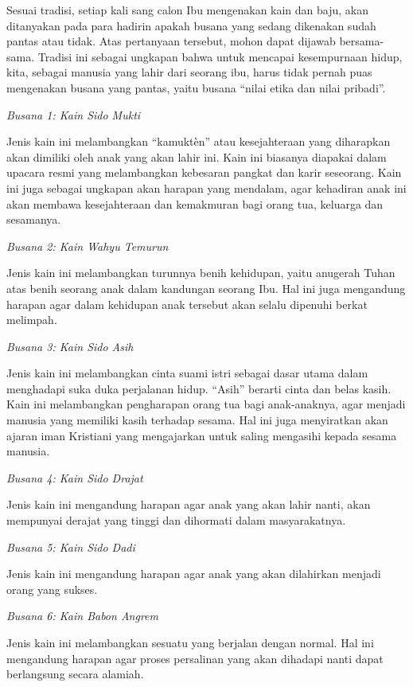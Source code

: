 \documentclass[a5paper,headsepline,titlepage,10pt,nnormalheadings,DIVcalc,twoside]{scrbook}
\begin{document}
{Sesuai tradisi, setiap kali sang calon Ibu mengenakan kain dan baju, akan ditanyakan pada para hadirin apakah busana yang sedang dikenakan sudah pantas atau tidak. Atas pertanyaan tersebut, mohon dapat dijawab bersama-sama. Tradisi ini sebagai ungkapan bahwa untuk mencapai kesempurnaan hidup, kita, sebagai manusia yang lahir dari seorang ibu, harus tidak pernah puas mengenakan busana yang pantas, yaitu busana “nilai etika dan nilai pribadi”.
 
\textit{Busana 1: Kain Sido Mukti}
 
Jenis kain ini melambangkan “kamuktèn” atau kesejahteraan yang diharapkan akan dimiliki oleh anak yang akan lahir ini. Kain ini biasanya diapakai dalam upacara resmi yang melambangkan kebesaran pangkat dan karir seseorang. Kain ini juga sebagai ungkapan akan harapan yang mendalam, agar kehadiran anak ini akan membawa kesejahteraan dan kemakmuran bagi orang tua, keluarga dan sesamanya.
 
\textit{Busana 2: Kain Wahyu Temurun}
 
Jenis kain ini melambangkan turunnya benih kehidupan, yaitu anugerah Tuhan atas benih seorang anak dalam kandungan seorang Ibu. Hal ini juga mengandung harapan agar dalam kehidupan anak tersebut akan selalu dipenuhi berkat melimpah.

\textit{Busana 3: Kain Sido Asih}
 
Jenis kain ini melambangkan cinta suami istri sebagai dasar utama dalam menghadapi suka duka perjalanan hidup. “Asih” berarti cinta dan belas kasih. Kain ini melambangkan pengharapan orang tua bagi anak-anaknya, agar menjadi manusia yang memiliki kasih terhadap sesama. Hal ini juga menyiratkan akan ajaran iman Kristiani yang mengajarkan untuk saling mengasihi kepada sesama manusia.

\textit{Busana 4: Kain Sido Drajat}
 
Jenis kain ini mengandung harapan agar anak yang akan lahir nanti, akan mempunyai derajat yang tinggi dan dihormati dalam masyarakatnya.
 
\textit{Busana 5: Kain Sido Dadi}
 
Jenis kain ini mengandung harapan agar anak yang akan dilahirkan menjadi orang yang sukses.
 
\textit{Busana 6: Kain Babon Angrem}
 
Jenis kain ini melambangkan sesuatu yang berjalan dengan normal. Hal ini mengandung harapan agar proses persalinan yang akan dihadapi nanti dapat berlangsung secara alamiah.
 
}
\end{document}
